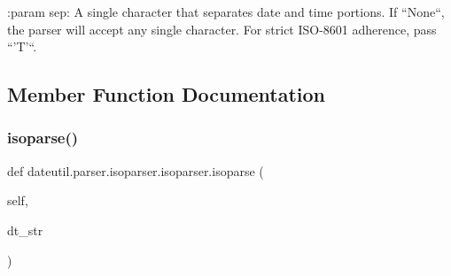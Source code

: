 \begin{DoxyVerb}:param sep:
    A single character that separates date and time portions. If
    ``None``, the parser will accept any single character.
    For strict ISO-8601 adherence, pass ``'T'``.
\end{DoxyVerb}
 

\subsection{Member Function Documentation}
\mbox{\label{classdateutil_1_1parser_1_1isoparser_1_1isoparser_a889eb130ffc9ff3d4f48f5cc95f15086}} 
\subsubsection{\texorpdfstring{isoparse()}{isoparse()}}
{\footnotesize\ttfamily def dateutil.\+parser.\+isoparser.\+isoparser.\+isoparse (\begin{DoxyParamCaption}\item[{}]{self,  }\item[{}]{dt\+\_\+str }\end{DoxyParamCaption})}

